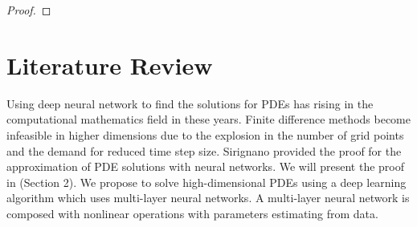 \documentclass{article}
\begin{document}
\begin{proof}
\end{proof}

\section{Literature Review}

Using deep neural network to find the solutions for PDEs has rising in the computational mathematics field in these years.  Finite difference methods become infeasible in higher dimensions due to the explosion in the number of grid points and the demand for reduced time step size. Sirignano \cite{sirignano} provided the proof for the approximation of PDE solutions with neural networks. We will present the proof in (Section 2). We propose to solve high-dimensional PDEs using a deep learning algorithm which uses multi-layer neural networks. A multi-layer neural network is composed with nonlinear operations with parameters estimating from data.




\end{document}
